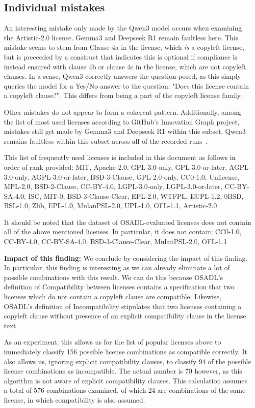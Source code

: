 \subsection{Individual mistakes}

An interesting mistake only made by the Qwen3 model occurs when examining the Artistic-2.0 license. Gemma3 and Deepseek R1 remain faultless here. This mistake seems to stem from Clause 4a in the license, which \textit{is} a copyleft license, but is preceeded by a construct that indicates this is optional if compliance is instead ensured with clause 4b or clause 4c in the license, which are not copyleft clauses. In a sense, Qwen3 correctly answers the question posed, as this simply queries the model for a Yes/No answer to the question: "Does this license contain a copyleft clause?". This differs from being a part of the copyleft license family.

Other mistakes do not appear to form a coherent pattern. Additionally, among the list of most used licenses according to GitHub's Innovation Graph project, mistakes still get made by Gemma3 and Deepseek R1 within this subset. Qwen3 remains faultless within this subset across all of the recorded runs~\cite{github_innovation_graph_2025}.

This list of frequently used licenses is included in this document as follows in order of rank provided: MIT, Apache-2.0, GPL-3.0-only, GPL-3.0-or-later, AGPL-3.0-only, AGPL-3.0-or-later, BSD-3-Clause, GPL-2.0-only, CC0-1.0, Unlicense, MPL-2.0, BSD-2-Clause, CC-BY-4.0, LGPL-3.0-only, LGPL-3.0-or-later, CC-BY-SA-4.0, ISC, MIT-0, BSD-3-Clause-Clear, EPL-2.0, WTFPL, EUPL-1.2, 0BSD, BSL-1.0, Zlib, EPL-1.0, MulanPSL-2.0, UPL-1.0, OFL-1.1, Artistic-2.0

It should be noted that the dataset of OSADL-evaluated licenses does not contain all of the above mentioned licenses. In particular, it does not contain: CC0-1.0, CC-BY-4.0, CC-BY-SA-4.0, BSD-3-Clause-Clear, MulanPSL-2.0, OFL-1.1

\textbf{Impact of this finding:} We conclude by considering the impact of this finding. In particular, this finding is interesting as we can already eliminate a lot of possible combinations with this result. We can do this because OSADL's definition of Compatibility between licenses contains a specification that two licenses which do not contain a copyleft clause are compatible. Likewise, OSADL's definition of Incompatibility stipulates that two licenses containing a copyleft clause without presence of an explicit compatibility clause in the license text.

As an experiment, this allows us for the list of popular licenses above to immediately classify 156 possible license combinations as compatible correctly. It also allows us, ignoring explicit compatibility clauses, to classify 94 of the possible license combinations as incompatible. The actual number is 70 however, as this algorithm is not aware of explicit compatibility clauses. This calculation assumes a total of 576 combinations examined, of which 24 are combinations of the same license, in which compatibility is also assumed.


